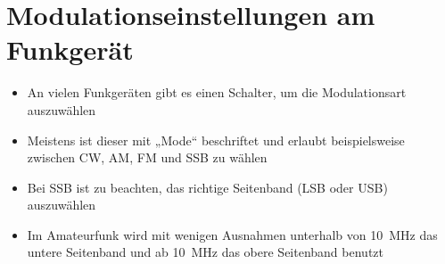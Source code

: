 
\section{Modulationseinstellungen am Funkgerät}
\label{section:trxmodulation}
\begin{frame}%
\begin{itemize}
  \item An vielen Funkgeräten gibt es einen Schalter, um die Modulationsart auszuwählen
  \item Meistens ist dieser mit „Mode“ beschriftet und erlaubt beispielsweise zwischen CW, AM, FM und SSB zu wählen
  \end{itemize}
\end{frame}

\begin{frame}

\end{frame}

\begin{frame}\begin{itemize}
  \item Bei SSB ist zu beachten, das richtige Seitenband (LSB oder USB) auszuwählen
  \item Im Amateurfunk wird mit wenigen Ausnahmen unterhalb von \qty{10}{\mega\hertz} das untere Seitenband und ab \qty{10}{\mega\hertz} das obere Seitenband benutzt
  \end{itemize}

\end{frame}


